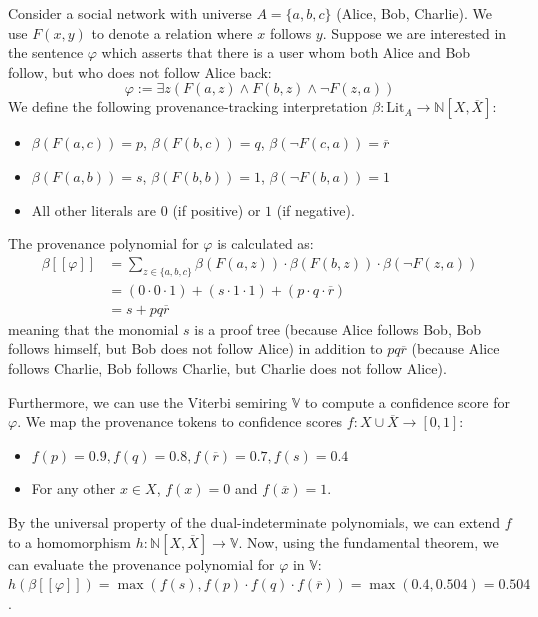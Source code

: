 \documentclass[oneside, 11pt]{amsbook}
\theoremstyle{plain}
\theoremstyle{definition}
\theoremstyle{remark}
\begin{document}
\begin{exmpl}
    \label{socialnetwork}
    Consider a social network with universe $A = \{a, b, c\}$ (Alice, Bob, Charlie). We use $F(x, y)$ to denote a relation where $x$ follows $y$. Suppose we are interested in the sentence $\varphi$ which asserts that there is a user whom both Alice and Bob follow, but who does not follow Alice back:
    \[
        \varphi := \exists z (F(a, z) \land F(b, z) \land \lnot F(z, a))
    \]
    We define the following provenance-tracking interpretation $\beta : \mathrm{Lit}_A \rightarrow \mathbb{N}[X,\overline{X}]$:
    \begin{itemize}
        \item $\beta(F(a, c)) = p$, $\beta(F(b, c)) = q$, $\beta(\lnot F(c, a)) = \overline{r}$
        \item $\beta(F(a, b)) = s$, $\beta(F(b, b)) = 1$, $\beta(\lnot F(b, a)) = 1$
        \item All other literals are $0$ (if positive) or $1$ (if negative).
    \end{itemize}

    The provenance polynomial for $\varphi$ is calculated as:
    \begin{align*}
        \beta [\![ \varphi ]\!] & = \sum_{z \in \{a,b,c\}} \beta(F(a, z)) \cdot \beta(F(b, z)) \cdot \beta(\lnot F(z, a)) \\
                                & = (0 \cdot 0 \cdot 1) + (s \cdot 1 \cdot 1) + (p \cdot q \cdot \overline{r})            \\
                                & = s + pq\overline{r}
    \end{align*}
    meaning that the monomial $s$ is a proof tree (because Alice follows Bob, Bob follows himself, but Bob does not follow Alice) in addition to $pq\overline{r}$ (because Alice follows Charlie, Bob follows Charlie, but Charlie does not follow Alice).

    Furthermore, we can use the Viterbi semiring $\mathbb{V}$ to compute a confidence score for $\varphi$. We map the provenance tokens to confidence scores $f : X \cup \overline{X} \rightarrow [0,1]$:
    \begin{itemize}
        \item $f(p)=0.9, f(q)=0.8, f(\overline{r})=0.7, f(s)=0.4$
        \item For any other $x \in X$, $f(x) = 0$ and $f(\overline{x}) = 1$.
    \end{itemize}

    By the universal property of the dual-indeterminate polynomials, we can extend $f$ to a homomorphism $h : \mathbb{N}[X,\overline{X}] \rightarrow \mathbb{V}$. Now, using the fundamental theorem, we can evaluate the provenance polynomial for $\varphi$ in $\mathbb{V}$: $h(\beta [\![ \varphi ]\!]) = \max(f(s), f(p) \cdot f(q) \cdot f(\overline{r})) = \max(0.4, 0.504) = 0.504$.
\end{exmpl}
\end{document}
